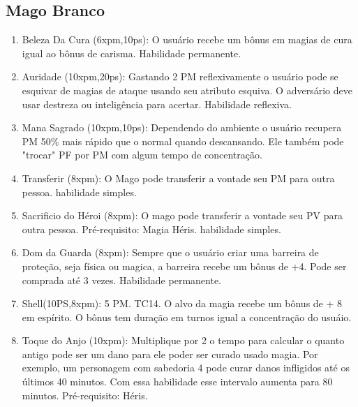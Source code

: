  \subsection{Mago Branco}
 
\begin{enumerate}
	\item Beleza Da Cura (6xpm,10ps): O usuário recebe um bônus em magias de cura igual ao bônus de carisma. Habilidade permanente.
 
	\item Auridade (10xpm,20ps): Gastando 2 PM reflexivamente o usuário pode se esquivar de magias de ataque usando seu atributo esquiva. O adversário deve usar destreza ou inteligência para acertar. Habilidade reflexiva. 
	 
		 
	\item Mana Sagrado (10xpm,10ps): Dependendo do ambiente o usuário recupera PM 50\% mais rápido que o normal quando descansando. Ele também pode "trocar" PF por PM com algum tempo de concentração.
 
	\item Transferir (8xpm): O Mago pode transferir a vontade seu PM para outra pessoa. habilidade simples. 
 
	\item Sacrificio do Héroi (8xpm): O mago pode transferir a vontade seu PV para outra pessoa. Pré-requisito: Magia Héris. habilidade simples.
 	
		
	\item Dom da Guarda (8xpm): Sempre que o usuário criar uma barreira de proteção, seja física ou magica, a barreira recebe um bônus de +4. Pode ser comprada até 3 vezes. Habilidade permanente.
	
		\item Shell(10PS,8xpm): 5 PM. TC14.\newline %
O alvo da magia recebe um bônus de + 8 em espírito. O bônus tem duração em turnos igual a concentração do usuáio.
	
	\item Toque do Anjo (10xpm): Multiplique por 2 o tempo para calcular o quanto antigo pode ser um dano para ele poder ser curado usado magia. Por exemplo, um personagem com sabedoria 4 pode curar danos infligidos até os últimos 40 minutos. Com essa habilidade esse intervalo aumenta para 80 minutos. Pré-requisito: Héris.
	

\end{enumerate}
